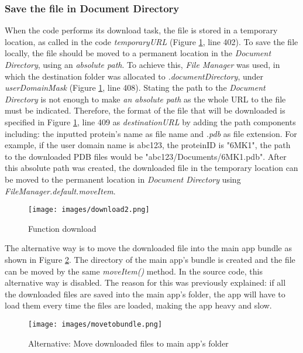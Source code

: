 \subsubsection{Save the file in Document Directory}
When the code performs its download task, the file is stored in a temporary location, as called in the code \emph{temporaryURL} (Figure \ref{fig:download2}, line 402). To save the file locally, the file should be moved to a permanent location in the \emph{Document Directory}, using an \emph{absolute path}. To achieve this, \emph{File Manager} was used, in which the destination folder was allocated to \emph{.documentDirectory}, under \emph{userDomainMask} (Figure \ref{fig:download2}, line 408). Stating the path to the \emph{Document Directory} is not enough to make \emph{an absolute path} as the whole URL to the file must be indicated. Therefore, the format of the file that will be downloaded is specified in Figure \ref{fig:download2}, line 409 as \emph{destinationURL} by adding the path components including: the inputted protein's name  as file name and \emph{.pdb} as file extension. For example, if the user domain name is abc123, the proteinID is "6MK1", the path to the downloaded PDB files would be "abc123/Documents/6MK1.pdb". After this absolute path was created, the downloaded file in the temporary location can be moved to the permanent location in \emph{Document Directory} using \emph{FileManager.default.moveItem}. 

 \begin{figure}[!htp]
	\centering
	\texttt{[image: images/download2.png]}
	\caption{Function download}
	\label{fig:download2}
\end{figure}


The alternative way is to move the downloaded file into the main app bundle as shown in Figure \ref{fig:movetobundle}. The directory of the main app's bundle is created and the file can be moved by the same \emph{moveItem()} method. In the source code, this alternative way is disabled. The reason for this was previously explained: if all the downloaded files are saved into the main app's folder, the app will have to load them every time the files are loaded, making the app heavy and slow. 
 \begin{figure}[!htp]
	\centering
	\texttt{[image: images/movetobundle.png]}
	\caption{Alternative: Move downloaded files to main app's folder}
	\label{fig:movetobundle}
\end{figure}


